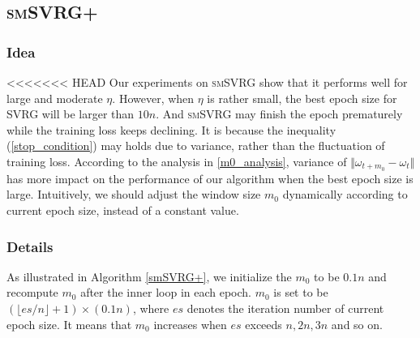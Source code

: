 \documentclass[conference]{IEEEtran}
\begin{document}
 \subsection{\textsc{smSVRG+}}
 \subsubsection{Idea}
<<<<<<< HEAD
 Our experiments on \textsc{smSVRG} show that it performs well for large and moderate $\eta$. However, when $\eta$ is rather small, the best epoch size for SVRG will be larger than $10n$. And \textsc{smSVRG} may finish the epoch prematurely while the training loss keeps declining. It is because the inequality (\ref{stop_condition}) may holds due to variance, rather than the fluctuation of training loss. According to the analysis in \ref{m0_analysis}, variance of $\Vert\omega_{t+m_0}-\omega_t\Vert$ has more impact on the performance of our algorithm when the best epoch size is large. Intuitively, we should adjust the window size $m_0$ dynamically according to current epoch size, instead of a constant value.
 \subsubsection{Details}
 As illustrated in Algorithm \ref{smSVRG+}, we initialize the $m_0$ to be $0.1n$ and recompute $m_0$ after the inner loop in each epoch. $m_0$ is set to be $(\lfloor es/n \rfloor+1) \times (0.1n)$, where $es$ denotes the iteration number of current epoch size. It means that $m_0$ increases when $es$ exceeds $n,2n,3n$ and so on.
\end{document}
